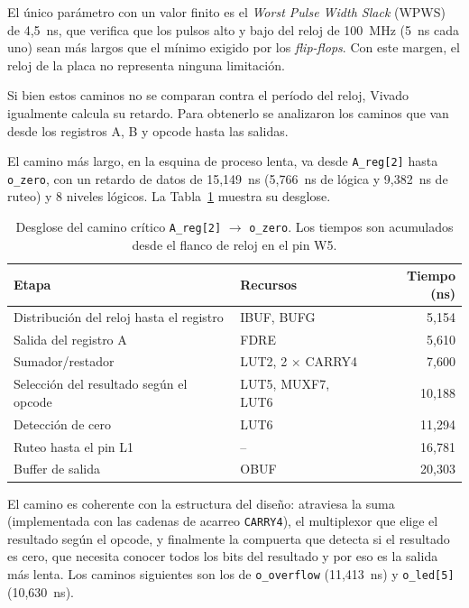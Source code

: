 El único parámetro con un valor finito es el \textit{Worst Pulse Width Slack} (WPWS) de 4,5~ns, que verifica que los pulsos alto y bajo del reloj de 100~MHz (5~ns cada uno) sean más largos que el mínimo exigido por los \textit{flip-flops}. Con este margen, el reloj de la placa no representa ninguna limitación.

Si bien estos caminos no se comparan contra el período del reloj, Vivado igualmente calcula su retardo. Para obtenerlo se analizaron los caminos que van desde los registros A, B y opcode hasta las salidas.

El camino más largo, en la esquina de proceso lenta, va desde \texttt{A\_reg[2]} hasta \texttt{o\_zero}, con un retardo de datos de 15,149~ns (5,766~ns de lógica y 9,382~ns de ruteo) y 8 niveles lógicos. La Tabla~\ref{tab:camino_critico} muestra su desglose.

\begin{table}[H]
	\centering
	\caption{Desglose del camino crítico \texttt{A\_reg[2]} $\rightarrow$ \texttt{o\_zero}. Los tiempos son acumulados desde el flanco de reloj en el pin W5.}
	\label{tab:camino_critico}
	\begin{tabular}{llr}
		\toprule
		\textbf{Etapa} & \textbf{Recursos} & \textbf{Tiempo (ns)} \\
		\midrule
		Distribución del reloj hasta el registro & IBUF, BUFG & 5,154 \\
		Salida del registro A & FDRE & 5,610 \\
		Sumador/restador & LUT2, 2 $\times$ CARRY4 & 7,600 \\
		Selección del resultado según el opcode & LUT5, MUXF7, LUT6 & 10,188 \\
		Detección de cero & LUT6 & 11,294 \\
		Ruteo hasta el pin L1 & -- & 16,781 \\
		Buffer de salida & OBUF & 20,303 \\
		\bottomrule
	\end{tabular}
\end{table}

El camino es coherente con la estructura del diseño: atraviesa la suma (implementada con las cadenas de acarreo \texttt{CARRY4}), el multiplexor que elige el resultado según el opcode, y finalmente la compuerta que detecta si el resultado es cero, que necesita conocer todos los bits del resultado y por eso es la salida más lenta. Los caminos siguientes son los de \texttt{o\_overflow} (11,413~ns) y \texttt{o\_led[5]} (10,630~ns).

